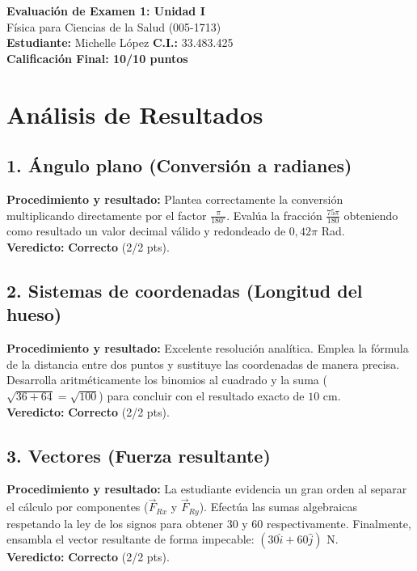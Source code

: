 \documentclass[12pt]{article}
\begin{document}
\begin{center}
    \Large \textbf{Evaluación de Examen 1: Unidad I} \\
    \large Física para Ciencias de la Salud (005-1713) \\
    \vspace{0.5cm}
    \textbf{Estudiante:} Michelle López \quad \textbf{C.I.:} 33.483.425
    \vspace{0.3cm} \\
    \large \textbf{Calificación Final: 10/10 puntos}
\end{center}

\vspace{0.5cm}

\section*{Análisis de Resultados}

\subsection*{1. Ángulo plano (Conversión a radianes)}
\textbf{Procedimiento y resultado:} Plantea correctamente la conversión multiplicando directamente por el factor $\frac{\pi}{180^\circ}$. Evalúa la fracción $\frac{75\pi}{180}$ obteniendo como resultado un valor decimal válido y redondeado de $0,42\pi$ Rad. \\
\textbf{Veredicto:} \textbf{Correcto} (2/2 pts).

\subsection*{2. Sistemas de coordenadas (Longitud del hueso)}
\textbf{Procedimiento y resultado:} Excelente resolución analítica. Emplea la fórmula de la distancia entre dos puntos y sustituye las coordenadas de manera precisa. Desarrolla aritméticamente los binomios al cuadrado y la suma ($\sqrt{36+64} = \sqrt{100}$) para concluir con el resultado exacto de $10$ cm. \\
\textbf{Veredicto:} \textbf{Correcto} (2/2 pts).

\subsection*{3. Vectores (Fuerza resultante)}
\textbf{Procedimiento y resultado:} La estudiante evidencia un gran orden al separar el cálculo por componentes ($\vec{F}_{Rx}$ y $\vec{F}_{Ry}$). Efectúa las sumas algebraicas respetando la ley de los signos para obtener 30 y 60 respectivamente. Finalmente, ensambla el vector resultante de forma impecable: $(30\hat{i} + 60\hat{j})$ N. \\
\textbf{Veredicto:} \textbf{Correcto} (2/2 pts).
\end{document}
